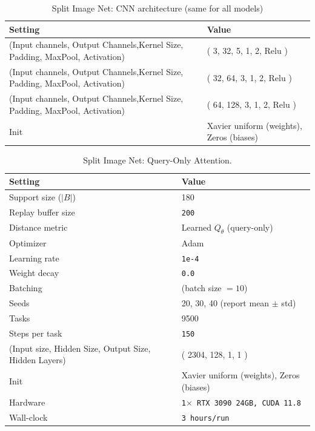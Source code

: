 \documentclass{article}
\begin{document}
\begin{table}[H]
\centering
\footnotesize
\caption{Split Image Net: CNN architecture (same for all models)}
\label{tab:split_image_net_cnn}
\begin{tabular}{@{}ll@{}}
\toprule
Setting & Value \\ \midrule
(Input channels, Output Channels,Kernel Size, Padding, MaxPool, Activation) & ( 3, 32, 5, 1, 2, Relu ) \\ 
(Input channels, Output Channels,Kernel Size, Padding, MaxPool, Activation) & ( 32, 64, 3, 1, 2, Relu ) \\ 
(Input channels, Output Channels,Kernel Size, Padding, MaxPool, Activation) & ( 64, 128, 3, 1, 2, Relu ) \\ 
Init & Xavier uniform (weights), Zeros (biases) \\
\bottomrule
\end{tabular}
\end{table}

\begin{table}[H]
\centering
\footnotesize
\caption{Split Image Net: Query-Only Attention.}
\label{tab:split_image_net_query_only_attention_v1}
\begin{tabular}{@{}ll@{}}
\toprule
Setting & Value \\ \midrule
Support size ($|B|$) & 180 \\
Replay buffer size & \texttt{200} \\
Distance metric & Learned $Q_{\theta}$ (query-only) \\
Optimizer & Adam \\
Learning rate & \texttt{1e-4} \\
Weight decay & \texttt{0.0} \\
Batching & (batch size $=10$) \\
Seeds & 20, 30, 40 (report mean $\pm$ std) \\
Tasks & 9500 \\
Steps per task & \texttt{150} \\
(Input size, Hidden Size, Output Size, Hidden Layers) & ( 2304, 128, 1, 1 ) \\ 
Init & Xavier uniform (weights), Zeros (biases) \\
Hardware & \texttt{1$\times$ RTX 3090 24GB, CUDA 11.8} \\
Wall-clock & \texttt{3 hours/run} \\
\bottomrule
\end{tabular}
\end{table}
\end{document}
